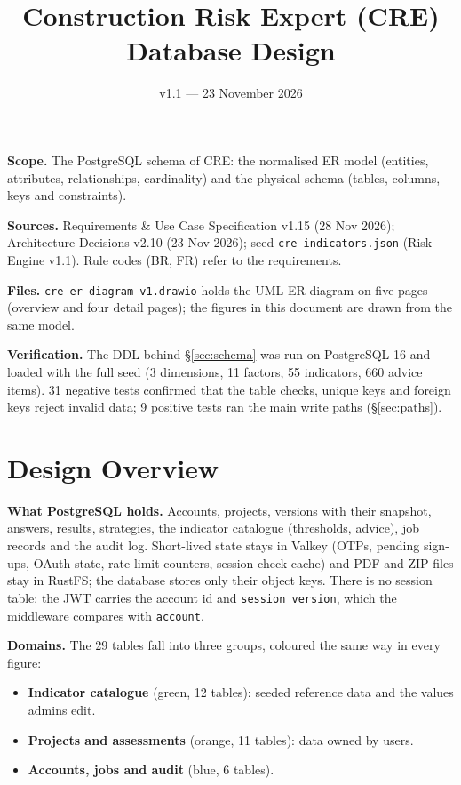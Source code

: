 \documentclass[11pt,a4paper]{article}
\title{\textcolor{creBlue}{\textbf{Construction Risk Expert (CRE)}}\\[2pt]\large Database Design}
\author{}
\date{v1.1 --- 23 November 2026}
\newcommand{\tb}[1]{\texttt{#1}}
\begin{document}
\maketitle

\noindent\textbf{Scope.} The PostgreSQL schema of CRE: the normalised ER model (entities, attributes, relationships, cardinality) and the physical schema (tables, columns, keys and constraints).

\noindent\textbf{Sources.} Requirements \& Use Case Specification v1.15 (28 Nov 2026); Architecture Decisions v2.10 (23 Nov 2026); seed \tb{cre-indicators.json} (Risk Engine v1.1). Rule codes (BR, FR) refer to the requirements.

\noindent\textbf{Files.} \tb{cre-er-diagram-v1.drawio} holds the UML ER diagram on five pages (overview and four detail pages); the figures in this document are drawn from the same model.

\noindent\textbf{Verification.} The DDL behind \S\ref{sec:schema} was run on PostgreSQL 16 and loaded with the full seed (3 dimensions, 11 factors, 55 indicators, 660 advice items). 31 negative tests confirmed that the table checks, unique keys and foreign keys reject invalid data; 9 positive tests ran the main write paths (\S\ref{sec:paths}).

\needspace{0.5\textheight}\section{Design Overview}

\noindent\textbf{What PostgreSQL holds.} Accounts, projects, versions with their snapshot, answers, results, strategies, the indicator catalogue (thresholds, advice), job records and the audit log. Short-lived state stays in Valkey (OTPs, pending sign-ups, OAuth state, rate-limit counters, session-check cache) and PDF and ZIP files stay in RustFS; the database stores only their object keys. There is no session table: the JWT carries the account id and \tb{session\_version}, which the middleware compares with \tb{account}.

\noindent\textbf{Domains.} The 29 tables fall into three groups, coloured the same way in every figure:
\begin{itemize}
\item \textbf{Indicator catalogue} (green, 12 tables): seeded reference data and the values admins edit.
\item \textbf{Projects and assessments} (orange, 11 tables): data owned by users.
\item \textbf{Accounts, jobs and audit} (blue, 6 tables).
\end{itemize}
\end{document}
